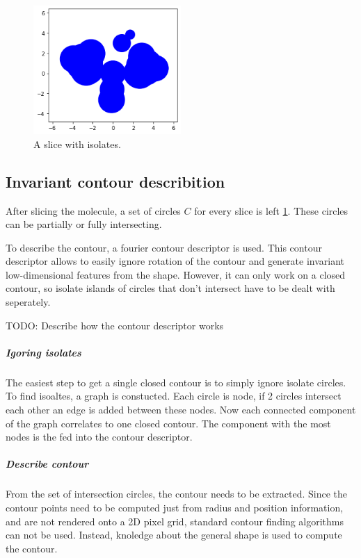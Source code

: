 \begin{figure} [h]
  \centering
  \includegraphics[width=0.5\textwidth]{figures/slice-iso.png} %
  \caption{A slice with isolates.}
  \label{fig:slice}
\end{figure}

\subsection{Invariant contour describition}

After slicing the molecule, a set of circles $C$ for every slice is left \ref{fig:slice}.
These circles can be partially or fully intersecting. 

To describe the contour, a fourier contour descriptor is used.
This contour descriptor allows to easily ignore rotation of the contour and generate invariant low-dimensional features from the shape.
However, it can only work on a closed contour, so isolate islands of circles that don't intersect have to be dealt with seperately.

TODO: Describe how the contour descriptor works

\subparagraph{Igoring isolates} 

The easiest step to get a single closed contour is to simply ignore isolate circles.
To find isoaltes, a graph is constucted. 
Each circle is node, if 2 circles intersect each other an edge is added between these nodes.
Now each connected component of the graph correlates to one closed contour. 
The component with the most nodes is the fed into the contour descriptor.

\subparagraph{Describe contour}

From the set of intersection circles, the contour needs to be extracted. 
Since the contour points need to be computed just from radius and position information, and are not rendered onto a 2D pixel grid, standard contour finding algorithms can not be used.
Instead, knoledge about the general shape is used to compute the contour. 

